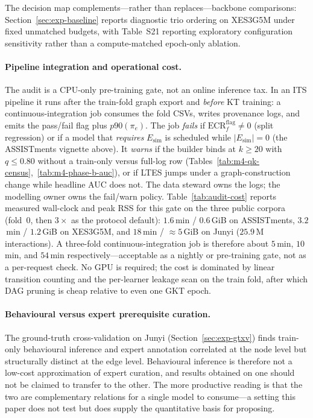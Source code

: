 \documentclass[preprint,10pt,doubleblind]{elsarticle}
\newcommand{\Esim}{\ensuremath{E_{\text{sim}}}}
\begin{document}
The decision map complements---rather than replaces---backbone comparisons:
Section~\ref{sec:exp-baseline} reports diagnostic trio ordering on XES3G5M under
fixed unmatched budgets, with Table~S21 reporting exploratory configuration
sensitivity rather than a compute-matched epoch-only ablation.

\paragraph{Pipeline integration and operational cost.}
The audit is a CPU-only pre-training gate, not an online inference tax.
In an ITS pipeline it runs after the train-fold graph export and
\emph{before} KT training: a continuous-integration job consumes the
fold CSVs, writes provenance logs, and emits the pass/fail flag plus
$p90(\pi_e)$. The job \emph{fails} if $\mathrm{ECR}^{\mathrm{flag}}_f{\neq}0$
(split regression) or if a model that \emph{requires} $\Esim$ is scheduled
while $|E_{\mathrm{sim}}|{=}0$ (the ASSISTments vignette above). It
\emph{warns} if the builder binds at $k{\ge}20$ with $q{\le}0.80$ without a
train-only versus full-log row (Tables~\ref{tab:m4-qk-census},~\ref{tab:m4-phase-b-auc}), or if LTES
jumps under a graph-construction change while headline AUC does not.
The data steward owns the logs; the modelling owner owns the fail/warn
policy. Table~\ref{tab:audit-cost} reports measured wall-clock and peak RSS
for this gate on the three public corpora (fold~0, then $3\times$ as the
protocol default): $1.6$\,min / $0.6$\,GiB on ASSISTments, $3.2$\,min /
$1.2$\,GiB on XES3G5M, and $18$\,min / ${\approx}5$\,GiB on Junyi
($25.9$\,M interactions). A three-fold continuous-integration job is therefore
about $5$\,min, $10$\,min, and $54$\,min respectively---acceptable as a
nightly or pre-training gate, not as a per-request check.
No GPU is required; the cost is dominated by linear
transition counting and the per-learner leakage scan on the train fold, after which DAG pruning is cheap relative to even one GKT epoch.

\paragraph{Behavioural versus expert prerequisite curation.}
The ground-truth cross-validation on Junyi (Section~\ref{sec:exp-gtxv}) finds
train-only behavioural inference and expert annotation correlated at the node
level but structurally distinct at the edge level. Behavioural inference is
therefore not a low-cost approximation of expert curation, and results obtained
on one should not be claimed to transfer to the other. The more productive
reading is that the two are complementary relations for a single model to
consume---a setting this paper does not test but does supply the quantitative
basis for proposing.
\end{document}
